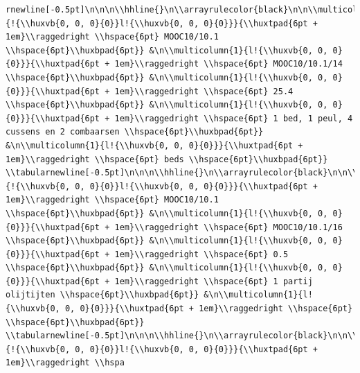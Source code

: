 \documentclass[11pt,preprint, authoryear]{elsarticle}
\numberwithin{equation}{section}
\numberwithin{figure}{section}
\numberwithin{table}{section}
\begin{document}
\begin{verbatim}
rnewline[-0.5pt]\n\n\n\\hhline{}\n\\arrayrulecolor{black}\n\n\\multicolumn{1}{!{\\huxvb{0, 0, 0}{0}}l!{\\huxvb{0, 0, 0}{0}}}{\\huxtpad{6pt + 1em}\\raggedright \\hspace{6pt} MOOC10/10.1 \\hspace{6pt}\\huxbpad{6pt}} &\n\\multicolumn{1}{l!{\\huxvb{0, 0, 0}{0}}}{\\huxtpad{6pt + 1em}\\raggedright \\hspace{6pt} MOOC10/10.1/14 \\hspace{6pt}\\huxbpad{6pt}} &\n\\multicolumn{1}{l!{\\huxvb{0, 0, 0}{0}}}{\\huxtpad{6pt + 1em}\\raggedright \\hspace{6pt} 25.4 \\hspace{6pt}\\huxbpad{6pt}} &\n\\multicolumn{1}{l!{\\huxvb{0, 0, 0}{0}}}{\\huxtpad{6pt + 1em}\\raggedright \\hspace{6pt} 1 bed, 1 peul, 4 cussens en 2 combaarsen \\hspace{6pt}\\huxbpad{6pt}} &\n\\multicolumn{1}{l!{\\huxvb{0, 0, 0}{0}}}{\\huxtpad{6pt + 1em}\\raggedright \\hspace{6pt} beds \\hspace{6pt}\\huxbpad{6pt}} \\tabularnewline[-0.5pt]\n\n\n\\hhline{}\n\\arrayrulecolor{black}\n\n\\multicolumn{1}{!{\\huxvb{0, 0, 0}{0}}l!{\\huxvb{0, 0, 0}{0}}}{\\huxtpad{6pt + 1em}\\raggedright \\hspace{6pt} MOOC10/10.1 \\hspace{6pt}\\huxbpad{6pt}} &\n\\multicolumn{1}{l!{\\huxvb{0, 0, 0}{0}}}{\\huxtpad{6pt + 1em}\\raggedright \\hspace{6pt} MOOC10/10.1/16 \\hspace{6pt}\\huxbpad{6pt}} &\n\\multicolumn{1}{l!{\\huxvb{0, 0, 0}{0}}}{\\huxtpad{6pt + 1em}\\raggedright \\hspace{6pt} 0.5 \\hspace{6pt}\\huxbpad{6pt}} &\n\\multicolumn{1}{l!{\\huxvb{0, 0, 0}{0}}}{\\huxtpad{6pt + 1em}\\raggedright \\hspace{6pt} 1 partij olijtijten \\hspace{6pt}\\huxbpad{6pt}} &\n\\multicolumn{1}{l!{\\huxvb{0, 0, 0}{0}}}{\\huxtpad{6pt + 1em}\\raggedright \\hspace{6pt}  \\hspace{6pt}\\huxbpad{6pt}} \\tabularnewline[-0.5pt]\n\n\n\\hhline{}\n\\arrayrulecolor{black}\n\n\\multicolumn{1}{!{\\huxvb{0, 0, 0}{0}}l!{\\huxvb{0, 0, 0}{0}}}{\\huxtpad{6pt + 1em}\\raggedright \\hspa
\end{verbatim}
\end{document}
